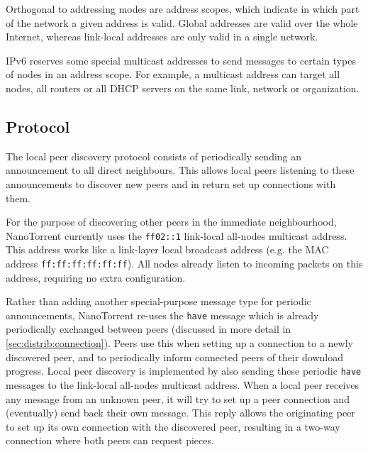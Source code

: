 Orthogonal to addressing modes are address scopes, which indicate in which part of the network a given address is valid. Global addresses are valid over the whole Internet, whereas link-local addresses are only valid in a single network.

\gls{IPv6} reserves some special multicast addresses to send messages to certain types of nodes in an address scope. For example, a multicast address can target all nodes, all routers or all \gls{DHCP} servers on the same link, network or organization.

\subsection{Protocol}
The local peer discovery protocol consists of periodically sending an announcement to all direct neighbours. This allows local peers listening to these announcements to discover new peers and in return set up connections with them.

For the purpose of discovering other peers in the immediate neighbourhood, NanoTorrent currently uses the \texttt{ff02::1} link-local all-nodes multicast address. This address works like a link-layer local broadcast address (e.g. the \gls{MAC} address \texttt{ff:ff:ff:ff:ff:ff}). All nodes already listen to incoming packets on this address, requiring no extra configuration.

Rather than adding another special-purpose message type for periodic announcements, NanoTorrent re-uses the \texttt{have} message which is already periodically exchanged between peers (discussed in more detail in \ref{sec:distrib:connection}). Peers use this when setting up a connection to a newly discovered peer, and to periodically inform connected peers of their download progress. Local peer discovery is implemented by also sending these periodic \texttt{have} messages to the link-local all-nodes multicast address. When a local peer receives any message from an unknown peer, it will try to set up a peer connection and (eventually) send back their own message. This reply allows the originating peer to set up its own connection with the discovered peer, resulting in a two-way connection where both peers can request pieces.


